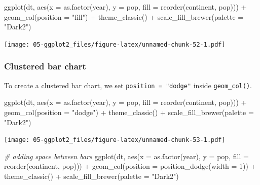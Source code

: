 \documentclass[
]{book}
\newenvironment{Shaded}{\begin{snugshade}}{\end{snugshade}}
\newcommand{\AttributeTok}[1]{\textcolor[rgb]{0.77,0.63,0.00}{#1}}
\newcommand{\CommentTok}[1]{\textcolor[rgb]{0.56,0.35,0.01}{\textit{#1}}}
\newcommand{\DecValTok}[1]{\textcolor[rgb]{0.00,0.00,0.81}{#1}}
\newcommand{\FunctionTok}[1]{\textcolor[rgb]{0.00,0.00,0.00}{#1}}
\newcommand{\NormalTok}[1]{#1}
\newcommand{\SpecialCharTok}[1]{\textcolor[rgb]{0.00,0.00,0.00}{#1}}
\newcommand{\StringTok}[1]{\textcolor[rgb]{0.31,0.60,0.02}{#1}}
\begin{document}
\begin{Shaded}
\begin{Highlighting}[]
\FunctionTok{ggplot}\NormalTok{(dt, }\FunctionTok{aes}\NormalTok{(}\AttributeTok{x =} \FunctionTok{as.factor}\NormalTok{(year), }\AttributeTok{y =}\NormalTok{ pop, }\AttributeTok{fill =} \FunctionTok{reorder}\NormalTok{(continent, pop))) }\SpecialCharTok{+} 
   \FunctionTok{geom\_col}\NormalTok{(}\AttributeTok{position =} \StringTok{"fill"}\NormalTok{) }\SpecialCharTok{+}
   \FunctionTok{theme\_classic}\NormalTok{() }\SpecialCharTok{+}
   \FunctionTok{scale\_fill\_brewer}\NormalTok{(}\AttributeTok{palette =} \StringTok{"Dark2"}\NormalTok{)}
\end{Highlighting}
\end{Shaded}

\texttt{[image: 05-ggplot2\_files/figure-latex/unnamed-chunk-52-1.pdf]}

\hypertarget{clustered-bar-chart}{%
\subsubsection{Clustered bar chart}\label{clustered-bar-chart}}

To create a clustered bar chart, we set \texttt{position\ =\ "dodge"} inside \texttt{geom\_col()}.

\begin{Shaded}
\begin{Highlighting}[]
\FunctionTok{ggplot}\NormalTok{(dt, }\FunctionTok{aes}\NormalTok{(}\AttributeTok{x =} \FunctionTok{as.factor}\NormalTok{(year), }\AttributeTok{y =}\NormalTok{ pop, }\AttributeTok{fill =} \FunctionTok{reorder}\NormalTok{(continent, pop))) }\SpecialCharTok{+} 
   \FunctionTok{geom\_col}\NormalTok{(}\AttributeTok{position =} \StringTok{"dodge"}\NormalTok{) }\SpecialCharTok{+}
   \FunctionTok{theme\_classic}\NormalTok{() }\SpecialCharTok{+}
   \FunctionTok{scale\_fill\_brewer}\NormalTok{(}\AttributeTok{palette =} \StringTok{"Dark2"}\NormalTok{)}
\end{Highlighting}
\end{Shaded}

\texttt{[image: 05-ggplot2\_files/figure-latex/unnamed-chunk-53-1.pdf]}

\begin{Shaded}
\begin{Highlighting}[]


\CommentTok{\# adding space between bars}
\FunctionTok{ggplot}\NormalTok{(dt, }\FunctionTok{aes}\NormalTok{(}\AttributeTok{x =} \FunctionTok{as.factor}\NormalTok{(year), }\AttributeTok{y =}\NormalTok{ pop, }\AttributeTok{fill =} \FunctionTok{reorder}\NormalTok{(continent, pop))) }\SpecialCharTok{+} 
   \FunctionTok{geom\_col}\NormalTok{(}\AttributeTok{position =} \FunctionTok{position\_dodge}\NormalTok{(}\AttributeTok{width =} \DecValTok{1}\NormalTok{)) }\SpecialCharTok{+}
   \FunctionTok{theme\_classic}\NormalTok{() }\SpecialCharTok{+}
   \FunctionTok{scale\_fill\_brewer}\NormalTok{(}\AttributeTok{palette =} \StringTok{"Dark2"}\NormalTok{)}
\end{Highlighting}
\end{Shaded}
\end{document}
